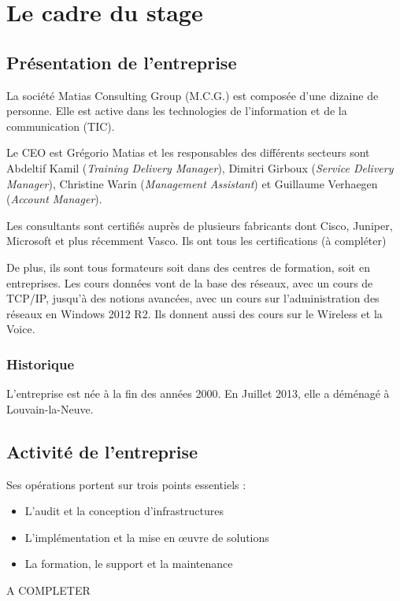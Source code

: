 \chapter{Le cadre du stage}
\section{Présentation de l'entreprise}
La société Matias Consulting Group (M.C.G.) est composée d'une dizaine de personne. 
Elle est active dans les technologies de l'information et de la communication (TIC).

Le CEO est Grégorio Matias et les responsables des différents secteurs sont Abdeltif Kamil (\textit{Training Delivery Manager}), Dimitri Girboux (\textit{Service Delivery Manager}), Christine Warin (\textit{Management Assistant}) et Guillaume Verhaegen (\textit{Account Manager}).

Les consultants sont certifiés auprès de plusieurs fabricants dont Cisco, Juniper, Microsoft et plus récemment Vasco.
Ils ont tous les certifications (à compléter)

De plus, ils sont tous formateurs soit dans des centres de formation, soit en entreprises.
Les cours données vont de la base des réseaux, avec un cours de TCP/IP, jusqu'à des notions avancées, avec un cours sur l'administration des réseaux en Windows 2012 R2. 
Ils donnent aussi des cours sur le Wireless et la Voice.
\subsection{Historique}
L'entreprise est née à la fin des années 2000.
En Juillet 2013, elle a déménagé à Louvain-la-Neuve.

\section{Activité de l'entreprise}

Ses opérations portent sur trois points essentiels : 
\begin{itemize}
	\item L'audit et la conception d'infrastructures
	\item L'implémentation et la mise en œuvre de solutions
	\item La formation, le support et la maintenance
\end{itemize}

A COMPLETER


